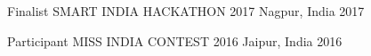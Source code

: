 \begin{cvhonors}
  \cvhonor
    {Finalist}
    {SMART INDIA HACKATHON 2017}
    {Nagpur, India}
    {2017}
 
  \cvhonor
    {Participant}
    {MISS INDIA CONTEST 2016}
    {Jaipur, India}
    {2016}
 
\end{cvhonors}
